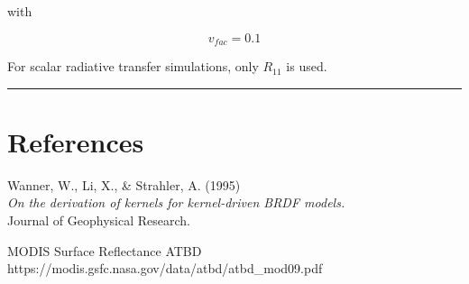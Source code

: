 \documentclass[
  letterpaper,
]{scrbook}
\begin{document}
with

\[
v_{fac} = 0.1
\]

For scalar radiative transfer simulations, only \(R_{11}\) is used.

\begin{center}\rule{0.5\linewidth}{0.5pt}\end{center}

\section{References}\label{references}

Wanner, W., Li, X., \& Strahler, A. (1995)\\
\emph{On the derivation of kernels for kernel-driven BRDF models.}\\
Journal of Geophysical Research.

MODIS Surface Reflectance ATBD\\
https://modis.gsfc.nasa.gov/data/atbd/atbd\_mod09.pdf
\end{document}
